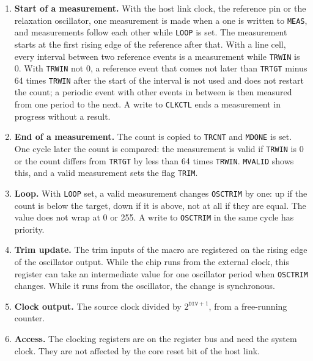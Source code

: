 \documentclass[10pt,a4paper]{article}
\newcommand{\reg}[1]{\texttt{#1}}
\begin{document}
\begin{enumerate}[label=\textbf{K\arabic*},leftmargin=2.6em]
link clock, the reference pin and the relaxation oscillator a measurement spans \reg{INT}+1 periods of the reference, from rising edge to
rising edge, after synchronisation to the source clock. For a line cell it spans from one reference event of
the receive cell \reg{REFCELL} to the next. The count stops at \texttt{0xFFFF}.
\item \textbf{Start of a measurement.} With the host link clock, the reference pin or the relaxation oscillator, one measurement is made
when a one is written to \reg{MEAS}, and measurements follow each other while \reg{LOOP} is set. The measurement
starts at the first rising edge of the reference after that. With a line cell, every interval between two
reference events is a measurement while \reg{TRWIN} is 0. With \reg{TRWIN} not 0, a reference event that comes not later than \reg{TRTGT} minus 64 times \reg{TRWIN} after the start of the interval is not used and does not restart the count; a periodic event with other events in between is then measured from one period to the next. A write to \reg{CLKCTL} ends a measurement in progress without a result.
\item \textbf{End of a measurement.} The count is copied to \reg{TRCNT} and \reg{MDONE} is set. One cycle later the
count is compared: the measurement is valid if \reg{TRWIN} is 0 or the count differs from \reg{TRTGT} by less
than 64 times \reg{TRWIN}. \reg{MVALID} shows this, and a valid measurement sets the flag \reg{TRIM}.
\item \textbf{Loop.} With \reg{LOOP} set, a valid measurement changes \reg{OSCTRIM} by one: up if the count is below
the target, down if it is above, not at all if they are equal. The value does not wrap at 0 or 255. A write
to \reg{OSCTRIM} in the same cycle has priority.
\item \textbf{Trim update.} The trim inputs of the macro are registered on the rising edge of the oscillator output.
While the chip runs from the external clock, this register can take an intermediate value for one oscillator
period when \reg{OSCTRIM} changes. While it runs from the oscillator, the change is synchronous.
\item \textbf{Clock output.} The source clock divided by $2^{\mathtt{DIV}+1}$, from a free-running counter.
\item \textbf{Access.} The clocking registers are on the register bus and need the system clock. They are not
affected by the core reset bit of the host link.
\end{enumerate}
\end{document}
